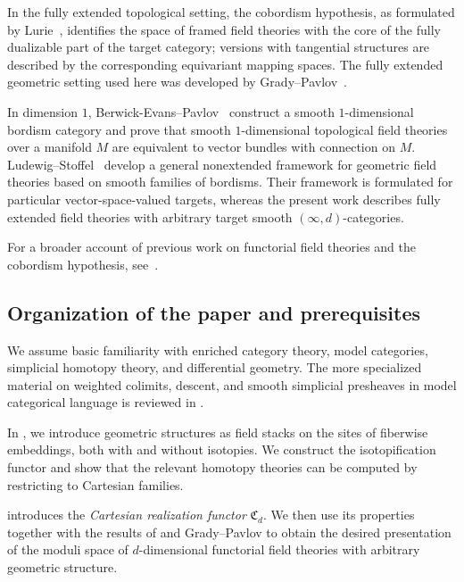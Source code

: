 \documentclass{amsart}
\newcommand{\Cc}{\mathfrak{C}}
\theoremstyle{definition}
\numberwithin{equation}{subsection}
\numberwithin{subsubsection}{subsection}
\begin{document}
In the fully extended topological setting, the cobordism hypothesis, as
formulated by Lurie~\cite{Lur09}, identifies the space of framed field theories
with the core of the fully dualizable part of the target category; versions with
tangential structures are described by the corresponding equivariant mapping
spaces. The fully extended geometric setting used here was developed by
Grady--Pavlov~\cite{GP22,GP23,GP26}.

In dimension \(1\), Berwick-Evans--Pavlov~\cite{BerwickEvansPavlov23} construct
a smooth \(1\)-dimensional bordism category and prove that smooth
\(1\)-dimensional topological field theories over a manifold \(M\) are
equivalent to vector bundles with connection on \(M\).
Ludewig--Stoffel~\cite{LS21} develop a general nonextended framework for
geometric field theories based on smooth families of bordisms. Their framework
is formulated for particular vector-space-valued targets, whereas the present
work describes fully extended field theories with arbitrary target smooth
\((\infty, d)\)-categories.

For a broader account of previous work on functorial field theories and the
cobordism hypothesis, see~\cite[Sections~1.1 and~1.2]{GP22}.

\subsection*{Organization of the paper and prerequisites}

We assume basic familiarity with enriched category theory, model categories,
simplicial homotopy theory, and differential geometry. The more specialized
material on
weighted colimits, descent, and smooth simplicial presheaves in model
categorical language is reviewed in
.

In , we introduce geometric structures as field
stacks on the sites of fiberwise embeddings, both with and without isotopies. We
construct the isotopification functor and show that the relevant homotopy
theories can be computed by restricting to Cartesian families.

 introduces the \emph{Cartesian realization functor}
\(\Cc_d\). We then use its properties together with the results of
 and Grady--Pavlov \cite{GP23,GP26} to obtain the
desired presentation of the moduli space of \(d\)-dimensional functorial field
theories with arbitrary geometric structure.
\end{document}
